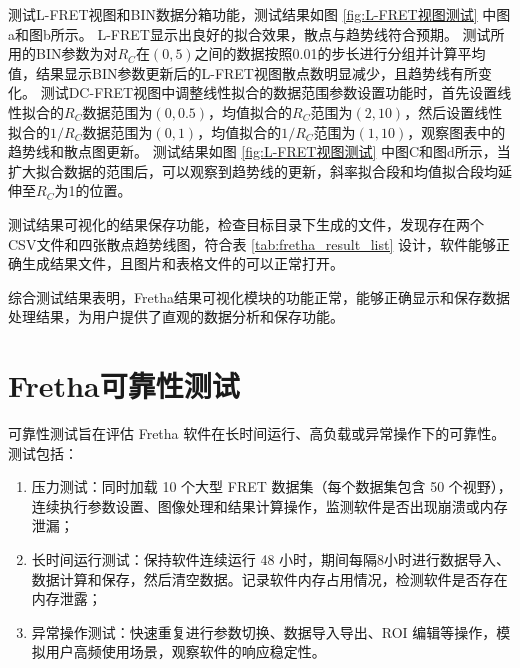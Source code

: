 测试L-FRET视图和BIN数据分箱功能，测试结果如图 \ref{fig:L-FRET视图测试} 中图a和图b所示。
L-FRET显示出良好的拟合效果，散点与趋势线符合预期。
测试所用的BIN参数为对$R_C$在$(0,5)$之间的数据按照0.01的步长进行分组并计算平均值，结果显示BIN参数更新后的L-FRET视图散点数明显减少，且趋势线有所变化。
测试DC-FRET视图中调整线性拟合的数据范围参数设置功能时，首先设置线性拟合的$R_C$数据范围为$(0,0.5)$，均值拟合的$R_C$范围为$(2,10)$，然后设置线性拟合的$1/R_C$数据范围为$(0,1)$，均值拟合的$1/R_C$范围为$(1,10)$，观察图表中的趋势线和散点图更新。
测试结果如图 \ref{fig:L-FRET视图测试} 中图C和图d所示，当扩大拟合数据的范围后，可以观察到趋势线的更新，斜率拟合段和均值拟合段均延伸至$R_C$为1的位置。

测试结果可视化的结果保存功能，检查目标目录下生成的文件，发现存在两个CSV文件和四张散点趋势线图，符合表 \ref{tab:fretha_result_list} 设计，软件能够正确生成结果文件，且图片和表格文件的可以正常打开。

综合测试结果表明，Fretha结果可视化模块的功能正常，能够正确显示和保存数据处理结果，为用户提供了直观的数据分析和保存功能。

\section{Fretha可靠性测试}
可靠性测试旨在评估 Fretha 软件在长时间运行、高负载或异常操作下的可靠性。测试包括：
\begin{enumerate}
  \item 压力测试：同时加载 10 个大型 FRET 数据集（每个数据集包含 50 个视野），连续执行参数设置、图像处理和结果计算操作，监测软件是否出现崩溃或内存泄漏；
  \item 长时间运行测试：保持软件连续运行 48 小时，期间每隔8小时进行数据导入、数据计算和保存，然后清空数据。记录软件内存占用情况，检测软件是否存在内存泄露；
  \item 异常操作测试：快速重复进行参数切换、数据导入导出、ROI 编辑等操作，模拟用户高频使用场景，观察软件的响应稳定性。
\end{enumerate}

